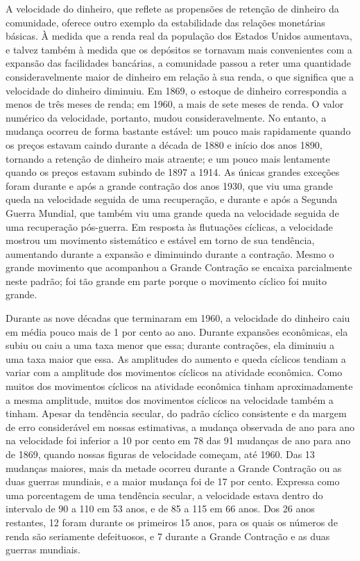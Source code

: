 \documentclass[a4paper,12pt]{article}[abntex2]
\begin{document}
A velocidade do dinheiro, que reflete as propensões de retenção de dinheiro da comunidade, oferece outro exemplo da estabilidade das relações monetárias básicas. À medida que a renda real da população dos Estados Unidos aumentava, e talvez também à medida que os depósitos se tornavam mais convenientes com a expansão das facilidades bancárias, a comunidade passou a reter uma quantidade consideravelmente maior de dinheiro em relação à sua renda, o que significa que a velocidade do dinheiro diminuiu. Em 1869, o estoque de dinheiro correspondia a menos de três meses de renda; em 1960, a mais de sete meses de renda. O valor numérico da velocidade, portanto, mudou consideravelmente. No entanto, a mudança ocorreu de forma bastante estável: um pouco mais rapidamente quando os preços estavam caindo durante a década de 1880 e início dos anos 1890, tornando a retenção de dinheiro mais atraente; e um pouco mais lentamente quando os preços estavam subindo de 1897 a 1914. As únicas grandes exceções foram durante e após a grande contração dos anos 1930, que viu uma grande queda na velocidade seguida de uma recuperação, e durante e após a Segunda Guerra Mundial, que também viu uma grande queda na velocidade seguida de uma recuperação pós-guerra. Em resposta às flutuações cíclicas, a velocidade mostrou um movimento sistemático e estável em torno de sua tendência, aumentando durante a expansão e diminuindo durante a contração. Mesmo o grande movimento que acompanhou a Grande Contração se encaixa parcialmente neste padrão; foi tão grande em parte porque o movimento cíclico foi muito grande.

Durante as nove décadas que terminaram em 1960, a velocidade do dinheiro caiu em média pouco mais de 1 por cento ao ano. Durante expansões econômicas, ela subiu ou caiu a uma taxa menor que essa; durante contrações, ela diminuiu a uma taxa maior que essa. As amplitudes do aumento e queda cíclicos tendiam a variar com a amplitude dos movimentos cíclicos na atividade econômica. Como muitos dos movimentos cíclicos na atividade econômica tinham aproximadamente a mesma amplitude, muitos dos movimentos cíclicos na velocidade também a tinham. Apesar da tendência secular, do padrão cíclico consistente e da margem de erro considerável em nossas estimativas, a mudança observada de ano para ano na velocidade foi inferior a 10 por cento em 78 das 91 mudanças de ano para ano de 1869, quando nossas figuras de velocidade começam, até 1960. Das 13 mudanças maiores, mais da metade ocorreu durante a Grande Contração ou as duas guerras mundiais, e a maior mudança foi de 17 por cento. Expressa como uma porcentagem de uma tendência secular, a velocidade estava dentro do intervalo de 90 a 110 em 53 anos, e de 85 a 115 em 66 anos. Dos 26 anos restantes, 12 foram durante os primeiros 15 anos, para os quais os números de renda são seriamente defeituosos, e 7 durante a Grande Contração e as duas guerras mundiais.
\end{document}
